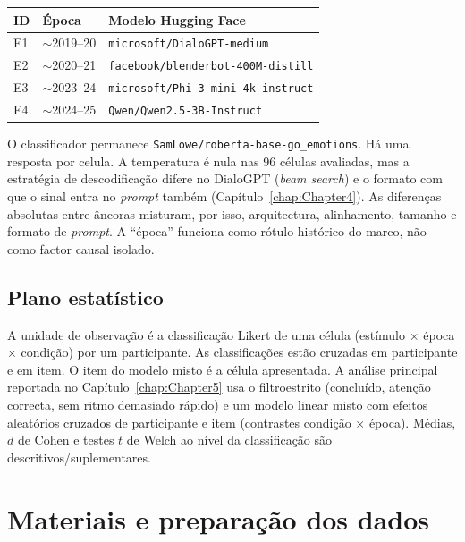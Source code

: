 \begin{center}
\begin{tabular}{llp{6.5cm}}
\hline
ID & Época & Modelo Hugging Face \\
\hline
E1 & \(\sim\)2019--20 & \texttt{microsoft/DialoGPT-medium} \parencite{Zhang2020DialoGPT} \\
E2 & \(\sim\)2020--21 & \texttt{facebook/blenderbot-400M-distill} \parencite{Roller2021BlenderBot} \\
E3 & \(\sim\)2023--24 & \texttt{microsoft/Phi-3-mini-4k-instruct} \parencite{Abdin2024Phi3} \\
E4 & \(\sim\)2024--25 & \texttt{Qwen/Qwen2.5-3B-Instruct} \parencite{Yang2025Qwen25} \\
\hline
\end{tabular}
\end{center}

O classificador permanece \texttt{SamLowe/roberta-base-go\_emotions}. Há uma resposta por \gls{celula}. A temperatura é nula nas 96 células avaliadas, mas a estratégia de descodificação difere no DialoGPT (\textit{beam search}) e o formato com que o sinal entra no \textit{prompt} também (Capítulo~\ref{chap:Chapter4}). As diferenças absolutas entre âncoras misturam, por isso, arquitectura, alinhamento, tamanho e formato de \textit{prompt}. A ``época'' funciona como rótulo histórico do marco, não como factor causal isolado.

\subsection{Plano estatístico}
\label{subsec:plano_estatistico}

A unidade de observação é a classificação Likert de uma célula (estímulo \(\times\) época \(\times\) condição) por um participante. As classificações estão cruzadas em participante e em item. O item do modelo misto é a célula apresentada. A análise principal reportada no Capítulo~\ref{chap:Chapter5} usa o \gls{filtroestrito} (concluído, atenção correcta, sem ritmo demasiado rápido) e um modelo linear misto com efeitos aleatórios cruzados de participante e item \parencite{Baayen2008Mixed} (contrastes condição \(\times\) época). Médias, \(d\) de Cohen e testes \(t\) de Welch ao nível da classificação são descritivos/suplementares.


\section{Materiais e preparação dos dados}
\label{sec:materiais}

